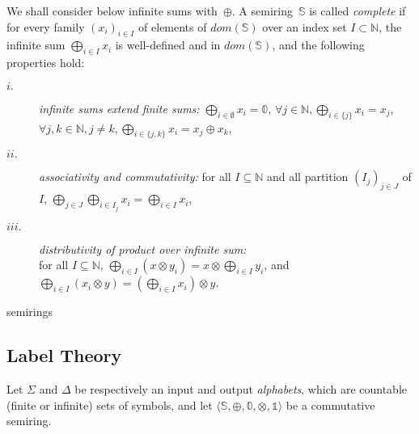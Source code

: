 \documentclass[runningheads]{llncs}
\def\<#1>{\langle #1 \rangle}
\newcommand{\Semiring}{\mathbb{S}}
\newcommand{\zero}{\mathbb{0}}
\newcommand{\one}{\mathbb{1}}
\newcommand{\dom}{\ensuremath{\mathit{dom}}}
\begin{document}
\medskip
We shall consider below infinite sums with~$\oplus$.
A semiring~$\Semiring$ is called \emph{complete} 
if for every family
$(x_i)_{i \in I}$ %
of elements of $\dom(\Semiring)$ over an index set $I \subset \mathbb{N}$,
the infinite sum $\bigoplus_{i \in I} x_i$
is well-defined and in $\dom(\Semiring)$,
and the following properties hold:
\begin{description}
\item[$i.$]
\emph{infinite sums extend finite sums:}
$\displaystyle\bigoplus_{i \in \emptyset} x_i = \zero$,\quad 
      $\forall j\in \mathbb{N}, \displaystyle\bigoplus_{i \in \{ j \}} x_i = x_j$,\quad
      $\forall j, k\in \mathbb{N}, j\neq k, 
      \displaystyle\bigoplus_{i \in \{ j, k \}} x_i = x_j \oplus x_k$,
%
\item[$ii.$]
\emph{associativity and commutativity:}
for all $I \subseteq \mathbb{N}$
and all partition $(I_{j})_{j \in J}$ of $I$, %
\(
\displaystyle
\bigoplus_{j \in J}\bigoplus_{i \in I_j} x_i = 
\bigoplus_{i \in I} x_i
\),
%
\item[$iii.$] 
\emph{distributivity of product over infinite sum:}\\
for all $I \subseteq \mathbb{N}$,
\(
\displaystyle
\bigoplus_{i \in I} (x \otimes y_i) = x \otimes \bigoplus_{i\in I} y_i\), and
\(
\displaystyle
\bigoplus_{i \in I} (x_i \otimes y) = (\bigoplus_{i \in I} x_i ) \otimes y\).
\end{description}



\begin{example}
semirings      
\end{example}
      

\subsection{Label Theory}
\label{section:symbols}

Let $\Sigma$ and $\Delta$ be respectively an input and output \emph{alphabets}, 
which are countable (finite or infinite) sets of symbols, 
and let $\< \Semiring, \oplus, \zero, \otimes, \one>$ be a commutative semiring.
\end{document}
